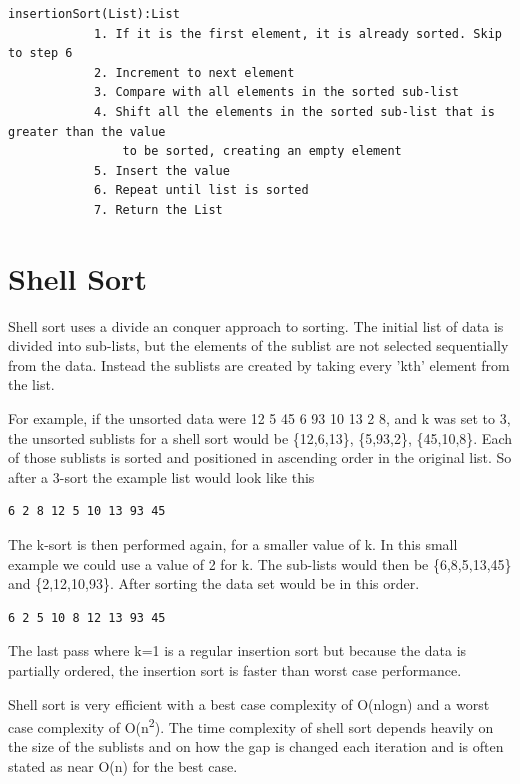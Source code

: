 \begin{lstlisting}
insertionSort(List):List
            1. If it is the first element, it is already sorted. Skip to step 6
            2. Increment to next element
            3. Compare with all elements in the sorted sub-list
            4. Shift all the elements in the sorted sub-list that is greater than the value 
                to be sorted, creating an empty element
            5. Insert the value
            6. Repeat until list is sorted
            7. Return the List
\end{lstlisting}

\section{Shell Sort}

Shell sort uses a divide an conquer approach to sorting.  The initial list of data is divided into sub-lists, but the elements of the sublist are not selected sequentially from the data.   Instead the sublists are created by taking every 'kth' element from the list.

For example,  if the unsorted data were 12 5 45 6 93 10 13 2 8,  and k was set to 3,  the unsorted sublists for a shell sort would be  
\{12,6,13\}, \{5,93,2\}, \{45,10,8\}.     Each of those sublists is sorted and positioned in ascending order in the original list.  So after a 3-sort the example list would look like this

\begin{verbatim}
6 2 8 12 5 10 13 93 45
 \end{verbatim}
 
 The k-sort is then performed again, for a smaller value of k.   In this small example we could use a value of 2 for k.   The sub-lists would then be 
 \{6,8,5,13,45\} and \{2,12,10,93\}.   After sorting the data set would be in this order.
 \begin{verbatim}
6 2 5 10 8 12 13 93 45
 \end{verbatim}
 
 The last pass where k=1 is a regular insertion sort but because the data is partially ordered, the insertion sort is faster than worst case performance.


Shell sort is very efficient with a best case complexity of O(nlogn) and a worst case complexity of O(n\textsuperscript{2}).  The time complexity of shell sort depends heavily on the size of the sublists and on how the gap is changed each iteration and is often stated as near O(n) for the best case.

